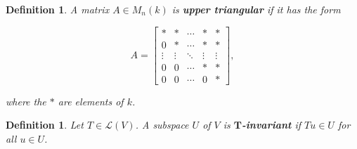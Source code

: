 \documentclass{article}
\theoremstyle{colontheorem}
\newtheorem{definition}[theorem]{Definition}
\newenvironment{Def}
{
	\begin{mdframed}[backgroundcolor=DefGreen!10]
	\begin{definition}
}
{
	\end{definition}
	\end{mdframed}
	
	\vspace{.15in}
}
\begin{document}
\begin{Def}
	
	A matrix $A \in M_n(k)$ is \textbf{upper triangular} if it has the form
	
	$$
	A = \begin{bmatrix}
		* & * & \cdots & * & *\\
		0 & * & \cdots & * & *\\
		\vdots & \vdots & \ddots & \vdots & \vdots\\
		0 & 0 & \cdots & * & *\\
		0 & 0 & \cdots & 0 & *
	\end{bmatrix},
	$$
	
	where the $*$ are elements of $k$.
	
\end{Def}



\begin{Def}
	
	Let $T \in \mathcal{L}(V)$. A subspace $U$ of $V$ is \textbf{$\mathbf{T}$-invariant} if $Tu \in U$ for all $u \in U$.
	
\end{Def}
\end{document}
